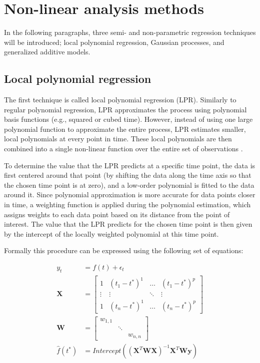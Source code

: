 \documentclass[man, floatsintext]{apa7}
\begin{document}
\section{Non-linear analysis methods}\label{method_introduction}

In the following paragraphs, three semi- and non-parametric regression
techniques will be introduced; local polynomial regression, Gaussian processes,
and generalized additive models.

\subsection{Local polynomial regression}

The first technique is called local polynomial regression (LPR). Similarly to
regular polynomial regression, LPR approximates the process using polynomial
basis functions (e.g., squared or cubed time). However, instead of using one
large polynomial function to approximate the entire process, LPR estimates
smaller, local polynomials at every point in time. These local polynomials are
then combined into a single non-linear function over the entire set of
observations \parencite{fan_adaptive_1995, ruppert_multivariate_1994,
  fan_local_2018}.

To determine the value that the LPR predicts at a specific time point, the data
is first centered around that point (by shifting the data along the time axis
so that the chosen time point is at zero), and a low-order polynomial is fitted
to the data around it. Since polynomial approximation is more accurate for data
points closer in time, a weighting function is applied during the polynomial
estimation, which assigns weights to each data point based on its distance from
the point of interest. The value that the LPR predicts for the chosen time
point is then given by the intercept of the locally weighted polynomial at this
time point.

Formally this procedure can be expressed using the following set of equations:

\begin{align}
  y_t          & = f(t) + \epsilon_t                            \\
  \textbf{X}   & =
  \begin{bmatrix}
    1      & (t_1 - t^*)^1 & \dots  & (t_1 - t^*)^p \\
    \vdots & \vdots        & \ddots & \vdots        \\
    1      & (t_n - t^*)^1 & \dots  & (t_n - t^*)^p
  \end{bmatrix} \\
  \textbf{W}   & =
  \begin{bmatrix}
    w_{1, 1} &        &          \\
             & \ddots &          \\
             &        & w_{n, n}
  \end{bmatrix}                            \\
  \hat{f}(t^*) & =
  Intercept((\textbf{X}^T\textbf{WX})^{-1}\textbf{X}^T\textbf{Wy})
  \label{eq:lpr_equations_last}
\end{align}
\end{document}
